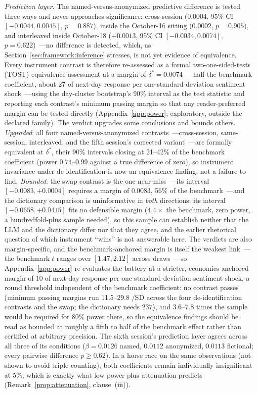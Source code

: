 \emph{Prediction layer.} The named-versus-anonymized predictive difference is tested three ways and never approaches significance: cross-session ($0.0004$, 95\% CI $[-0.0044, 0.0045]$, $p=0.887$), inside the October-16 sitting ($0.0002$, $p=0.905$), and interleaved inside October-18 ($+0.0013$, 95\% CI $[-0.0034, 0.0074]$, $p=0.622$)~---no difference is detected, which, as Section~\ref{sec:framework:inference} stresses, is not yet evidence of equivalence. Every instrument contrast is therefore re-assessed as a formal two-one-sided-tests (TOST) equivalence assessment at a margin of $\delta^{*}=0.0074$~---half the benchmark coefficient, about 27 \bps{} of next-day response per one-standard-deviation sentiment shock~---using the day-cluster bootstrap's 90\% interval as the test statistic and reporting each contrast's minimum passing margin so that any reader-preferred margin can be tested directly (Appendix~\ref{app:power}; exploratory, outside the declared family). The verdict upgrades some conclusions and bounds others. \emph{Upgraded}: all four named-versus-anonymized contrasts~---cross-session, same-session, interleaved, and the fifth session's corrected variant~---are formally equivalent at $\delta^{*}$, their 90\% intervals closing at 21--42\% of the benchmark coefficient (power 0.74--0.99 against a true difference of zero), so instrument invariance under de-identification is now an equivalence finding, not a failure to find. \emph{Bounded}: the swap contrast is the one near-miss~---its interval $[-0.0083, +0.0004]$ requires a margin of 0.0083, 56\% of the benchmark~---and the dictionary comparison is uninformative in \emph{both} directions: its interval $[-0.0658, +0.0415]$ fits no defensible margin ($4.4\times$ the benchmark, zero power, a hundredfold-plus sample needed), so this sample can establish neither that the LLM and the dictionary differ nor that they agree, and the earlier rhetorical question of which instrument ``wins'' is not answerable here. The verdicts are also margin-specific, and the benchmark-anchored margin is itself the weakest link~---the benchmark $t$ ranges over $[1.47, 2.12]$ across draws~---so Appendix~\ref{app:power} re-evaluates the battery at a stricter, economics-anchored margin of 10 \bps{} of next-day response per one-standard-deviation sentiment shock, a round threshold independent of the benchmark coefficient: no contrast passes (minimum passing margins run 11.5--29.8 \bps/SD across the four de-identification contrasts and the swap; the dictionary needs 237), and 3.6--7.8 times the sample would be required for 80\% power there, so the equivalence findings should be read as bounded at roughly a fifth to half of the benchmark effect rather than certified at arbitrary precision. The sixth session's prediction layer agrees across all three of its conditions ($\beta=0.0126$ named, $0.0112$ anonymized, $0.0113$ fictional; every pairwise difference $p\geq 0.62$). In a horse race on the same observations (not shown to avoid triple-counting), both coefficients remain individually insignificant at 5\%, which is exactly what low power plus attenuation predicts (Remark~\ref{prop:attenuation}, clause~(iii)).


